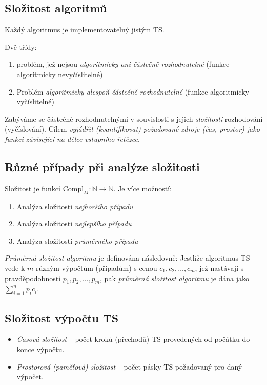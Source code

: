 \documentclass[a4paper, 11pt]{report}
\begin{document}
\subsection{Složitost algoritmů}
Každý algoritmus je implementovatelný jistým TS.

Dvě třídy:
\begin{enumerate}
	\item problém, jež nejsou \emph{algoritmicky ani částečně rozhodnutelné} (funkce algoritmicky nevyčíslitelné)
	\item Problém \emph{algoritmicky alespoň částečně rozhodnutelné} (funkce algoritmicky vyčíslitelné)
\end{enumerate}

Zabýváme se částečně rozhodnutelnými v souvislosti s jejich \emph{složitostí} rozhodování (vyčíslování). Cílem \emph{vyjádřit (kvantifikovat) požadované zdroje (čas, prostor) jako funkci závisející na délce vstupního řetězce}.

\subsection{Různé případy při analýze složitosti}
Složitost je funkcí $\text{Compl}_M: \mathbb{N} \to \mathbb{N}$. Je více možností:
\begin{enumerate}
	\item Analýza složitosti \emph{nejhoršího případu}
	\item Analýza složitosti \emph{nejlepšího případu}
	\item Analýza složitosti \emph{průměrného případu}
\end{enumerate}
\emph{Průměrná složitost algoritmu} je definována následovně: Jestliže algoritmus TS vede k $m$ různým výpočtům (případům) s cenou $c_1, c_2, \dots, c_m$, jež nastávají s pravděpodobností $p_1, p_2, \dots, p_m$, pak \emph{průměrná složitost algoritmu} je dána jako $\sum_{i=1}^n p_i c_i$.

\subsection{Složitost výpočtu TS}
\begin{itemize}
	\item \emph{Časová složitost} -- počet kroků (přechodů) TS provedených od počátku do konce výpočtu.
	\item \emph{Prostorová (paměťová) složitost} -- počet  pásky TS požadovaný pro daný výpočet.
\end{itemize}
\end{document}
